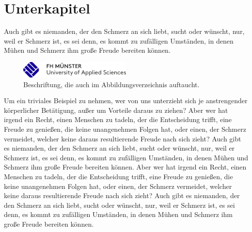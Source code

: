 \documentclass[12pt]{report}
\begin{document}
\section{Unterkapitel}
Auch gibt es niemanden, der den Schmerz an sich liebt, sucht oder wünscht, nur, weil er Schmerz ist,
es sei denn, es kommt zu zufälligen Umständen, in denen Mühen und Schmerz ihm große Freude bereiten
können.
\begin{figure}[h] %
    \includegraphics[width=0.5\textwidth]{fh_logo}
    \caption{Beschriftung, die auch im Abbildungsverzeichnis auftaucht.}
\end{figure}
Um ein triviales Beispiel zu nehmen, wer von uns unterzieht sich je anstrengender körperlicher
Betätigung, außer um Vorteile daraus zu ziehen? Aber wer hat irgend ein Recht, einen Menschen zu
tadeln, der die Entscheidung trifft, eine Freude zu genießen, die keine unangenehmen Folgen hat,
oder einen, der Schmerz vermeidet, welcher keine daraus resultierende Freude nach sich zieht? Auch
gibt es niemanden, der den Schmerz an sich liebt, sucht oder wünscht, nur, weil er Schmerz ist, es
sei denn, es kommt zu zufälligen Umständen, in denen Mühen und Schmerz ihm große Freude bereiten
können. Aber wer hat irgend ein Recht, einen Menschen zu
tadeln, der die Entscheidung trifft, eine Freude zu genießen, die keine unangenehmen Folgen hat,
oder einen, der Schmerz vermeidet, welcher keine daraus resultierende Freude nach sich zieht? Auch
gibt es niemanden, der den Schmerz an sich liebt, sucht oder wünscht, nur, weil er Schmerz ist, es
sei denn, es kommt zu zufälligen Umständen, in denen Mühen und Schmerz ihm große Freude bereiten
können. 
\end{document}
